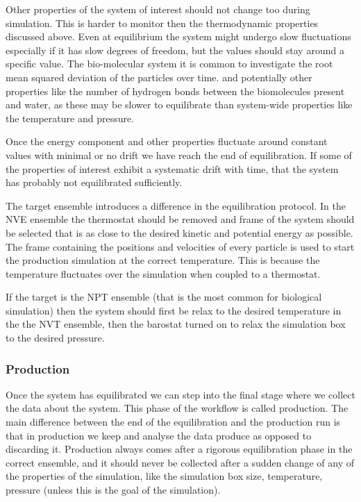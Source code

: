 Other properties of the system of interest should not change too during simulation. This is harder to monitor then the thermodynamic properties discussed above. Even at equilibrium the system might undergo slow fluctuations especially if it has slow degrees of freedom, but the values should stay around a specific value. The bio-molecular system it is common to investigate the root mean squared deviation of the particles over time. and potentially other properties like the number of hydrogen bonds between the biomolecules present and water, as these may be slower to equilibrate than system-wide properties like the temperature and pressure.

Once the energy component and other properties fluctuate around constant values with minimal or no drift we have reach the end of equilibration. If some of the properties of interest exhibit a systematic drift with time, that the system has probably not equilibrated sufficiently. 

The target ensemble introduces a difference in the equilibration protocol.  In the NVE ensemble the thermostat should be removed and frame of the system should be selected that is as close to the desired kinetic and potential energy as possible. The frame containing the positions and velocities of every particle is used to start the production simulation at the correct temperature. This is because the temperature fluctuates over the simulation when coupled to a thermostat.

If the target is the NPT ensemble (that is the most common for biological simulation) then the system should first be relax to the desired temperature in the the NVT ensemble, then the barostat turned on to relax the simulation box to the desired pressure.

\subsubsection{Production}

Once the system has equilibrated we can step into the final stage where we collect the data about the system. This phase of the workflow is called production. The main difference between the end of the equilibration and the production run is that in production we keep and analyse the data produce as opposed to discarding it. Production always comes after a rigorous equilibration phase in the correct ensemble, and it should never be collected after a sudden change of any of the properties of the simulation, like the simulation box size, temperature, pressure (unless this is the goal of the simulation).

